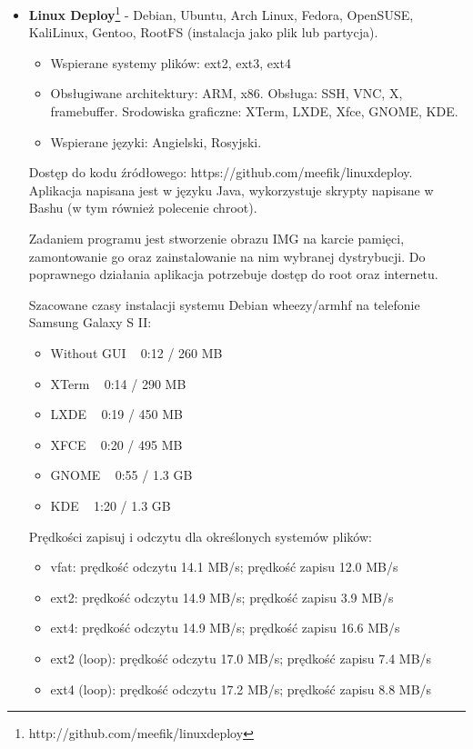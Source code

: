 \begin{itemize}
	\item \textbf{Linux Deploy}\footnote{http://github.com/meefik/linuxdeploy} - Debian, Ubuntu, Arch Linux, Fedora, OpenSUSE, KaliLinux, Gentoo, RootFS (instalacja jako plik lub partycja).
	
	\begin{itemize}
		\item Wspierane systemy plików: ext2, ext3, ext4
		\item Obsługiwane architektury: ARM, x86. Obsługa: SSH, VNC, X, framebuffer. Srodowiska graficzne: XTerm, LXDE, Xfce, GNOME, KDE.
		\item Wspierane języki: Angielski, Rosyjski.
	\end{itemize}
	
	Dostęp do kodu źródłowego: https://github.com/meefik/linuxdeploy. Aplikacja napisana jest w języku Java, wykorzystuje skrypty napisane w Bashu (w tym również polecenie chroot).
	
	Zadaniem programu jest stworzenie obrazu IMG na karcie pamięci, zamontowanie go oraz zainstalowanie na nim wybranej dystrybucji. Do poprawnego działania aplikacja potrzebuje dostęp do root oraz internetu. 
	
	Szacowane czasy instalacji systemu Debian wheezy/armhf na telefonie Samsung Galaxy S II:
	
	\begin{itemize}
		\item Without GUI ~ 0:12 / 260 MB
		\item XTerm ~ 0:14 / 290 MB
		\item LXDE ~ 0:19 / 450 MB
		\item XFCE ~ 0:20 / 495 MB
		\item GNOME ~ 0:55 / 1.3 GB
		\item KDE ~ 1:20 / 1.3 GB
	\end{itemize}
	
	Prędkości zapisuj i odczytu dla określonych systemów plików:
	
	\begin{itemize}
		\item	vfat: prędkość odczytu 14.1 MB/s; prędkość zapisu 12.0 MB/s
		\item	ext2: prędkość odczytu 14.9 MB/s; prędkość zapisu 3.9 MB/s
		\item	ext4: prędkość odczytu 14.9 MB/s; prędkość zapisu 16.6 MB/s
		\item	ext2 (loop): prędkość odczytu 17.0 MB/s; prędkość zapisu 7.4 MB/s
		\item	ext4 (loop): prędkość odczytu 17.2 MB/s; prędkość zapisu 8.8 MB/s
	\end{itemize}
	

\end{itemize}
